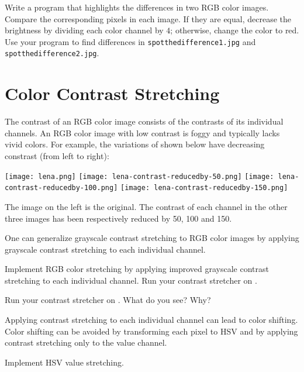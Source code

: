 \documentclass{book}
\begin{document}
\begin{exercise}
Write a program that highlights the differences in two RGB color images. Compare the corresponding pixels in each image. If they are equal, decrease the brightness by dividing each color channel by $4$; otherwise, change the color to red. Use your program to find differences in \texttt{spotthedifference1.jpg} and \texttt{spotthedifference2.jpg}.
\end{exercise}

\section{Color Contrast Stretching}\label{sec:color-contrast-stretching}
The contrast of an RGB color image consists of the contrasts of its individual channels. An RGB color image with low contrast is foggy and typically lacks vivid colors. For example, the variations of  shown below have decreasing constrast (from left to right):
\begin{center}
\texttt{[image: lena.png]}
\texttt{[image: lena-contrast-reducedby-50.png]}
\texttt{[image: lena-contrast-reducedby-100.png]}
\texttt{[image: lena-contrast-reducedby-150.png]}
\end{center}
The image on the left is the original. The contrast of each channel in the other three images has been respectively reduced by 50, 100 and 150.

One can generalize grayscale contrast stretching to RGB color images by applying grayscale contrast stretching to each individual channel. 

\begin{exercise}
Implement RGB color stretching by applying improved grayscale contrast stretching to each individual channel. Run your contrast stretcher on . 
\end{exercise}

\begin{exercise}
Run your contrast stretcher on . What do you see? Why?
\end{exercise}

Applying contrast stretching to each individual channel can lead to color shifting. Color shifting can be avoided by transforming each pixel to HSV and by applying contrast stretching only to the value channel.

\begin{exercise}
Implement HSV value stretching.
\end{exercise}

\end{document}
